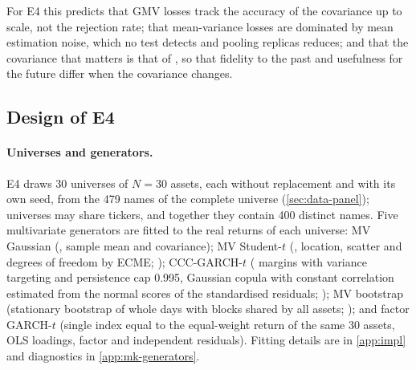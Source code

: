 For E4 this predicts that GMV losses track the accuracy of the covariance up to scale, not the
rejection rate; that mean-variance losses are dominated by mean estimation noise, which no test
detects and pooling replicas reduces; and that the covariance that matters is that of \TEST{}, so
that fidelity to the past and usefulness for the future differ when the covariance changes.

\subsection{Design of E4}\label{sec:mk-design}

\paragraph{Universes and generators.}
E4 draws 30 universes of $N=30$ assets, each without replacement and with its own seed, from the
479 names of the complete universe (\cref{sec:data-panel}); universes may share tickers, and
together they contain 400 distinct names. Five
multivariate generators are fitted to the real \TRAIN{} returns of each universe: MV Gaussian
(\iid{}, sample mean and covariance); MV Student-$t$ (\iid{}, location, scatter and degrees of
freedom by ECME; \citealp{liu1995ml}); CCC-GARCH-$t$ (\GARCHt{} margins with variance targeting
and persistence cap 0.995, Gaussian copula with constant correlation estimated from the normal
scores of the standardised residuals; \citealp{bollerslev1990modelling,joe2005asymptotic}); MV
bootstrap (stationary bootstrap of whole \TRAIN{} days with blocks shared by all assets;
\citealp{politis1994stationary}); and factor GARCH-$t$ (single index equal to the equal-weight
return of the same 30 assets, OLS loadings, \GARCHt{} factor and independent \GARCHt{} residuals).
Fitting details are in \cref{app:impl} and diagnostics in \cref{app:mk-generators}.

